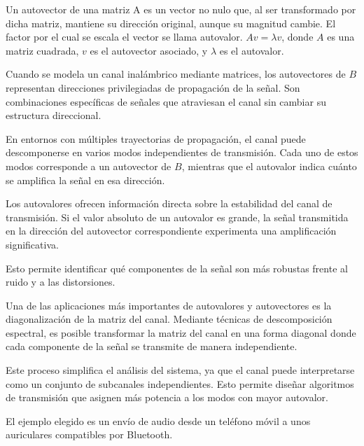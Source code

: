 \documentclass[letterpaper,12pt]{article}
\begin{document}
\newpage
{}



Un autovector de una matriz A es un vector no nulo que, al ser transformado por dicha matriz,
mantiene su dirección original, aunque su magnitud cambie. El factor por el cual se escala el vector
se llama autovalor. $Av=\lambda v$, donde $A$ es una matriz cuadrada, $v$ es el autovector asociado, y $\lambda$ es
el autovalor.

Cuando se modela un canal inalámbrico mediante matrices, los autovectores de $B$ representan
direcciones privilegiadas de propagación de la señal. Son combinaciones específicas de señales
que atraviesan el canal sin cambiar su estructura direccional.

En entornos con múltiples trayectorias de propagación, el canal puede descomponerse en varios
modos independientes de transmisión. Cada uno de estos modos corresponde a un autovector de
$B$, mientras que el autovalor indica cuánto se amplifica la señal en esa dirección.

Los autovalores ofrecen información directa sobre la estabilidad del canal de transmisión. Si el
valor absoluto de un autovalor es grande, la señal transmitida en la dirección del autovector
correspondiente experimenta una amplificación significativa.

Esto permite identificar qué componentes de la señal son más robustas frente al ruido y a las
distorsiones.

Una de las aplicaciones más importantes de autovalores y autovectores es la diagonalización de la
matriz del canal. Mediante técnicas de descomposición espectral, es posible transformar la matriz
del canal en una forma diagonal donde cada componente de la señal se transmite de manera
independiente.

Este proceso simplifica el análisis del sistema, ya que el canal puede interpretarse como un
conjunto de subcanales independientes. Esto permite diseñar algoritmos de transmisión que
asignen más potencia a los modos con mayor autovalor.



\newpage
{}
El ejemplo elegido es un envío de audio desde un teléfono móvil a unos auriculares compatibles
por Bluetooth.
\end{document}
